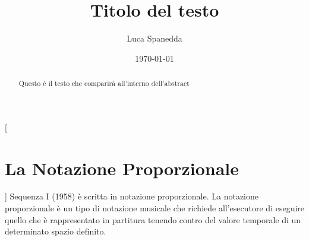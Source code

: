 \documentclass{article}
\begin{document}
\title{Titolo del testo}
\author{Luca Spanedda}
\date{\today}
\maketitle


\begin{abstract}
Questo è il testo che comparirà all'interno dell'abstract
\end{abstract}

\cleardoublepage
\begin{multicols}{2} 
[\section{La Notazione Proporzionale}]
Sequenza I (1958) è scritta in notazione proporzionale.
La notazione proporzionale è un tipo di notazione musicale che richiede all’esecutore
di eseguire quello che è rappresentato in partitura tenendo contro del valore
temporale di un determinato spazio definito.
\end{multicols}
\end{document}
